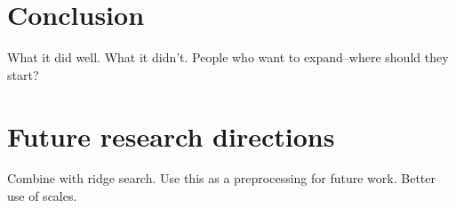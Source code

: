
\chapter{Conclusion}

What it did well. What it didn't. People who want to expand--where should they start? 

\chapter{Future research directions} \label{sec:conclusion.future-research}

Combine with ridge search.
Use this as a preprocessing for future work.
Better use of scales.